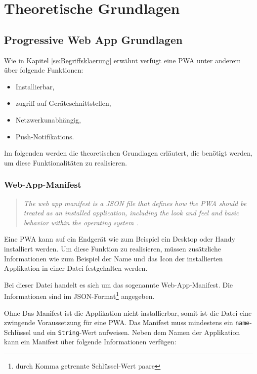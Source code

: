\chapter{Theoretische Grundlagen}

\section{Progressive Web App Grundlagen}

Wie in Kapitel \ref{se:Begriffsklaerung} erwähnt verfügt eine PWA unter anderem über folgende Funktionen: 
\begin{itemize}
    \item Installierbar,
    \item zugriff auf Geräteschnittstellen, 
    \item Netzwerkunabhängig,
    \item Push-Notifikations.
\end{itemize} 

Im folgenden werden die theoretischen Grundlagen erläutert, die benötigt werden, um diese Funktionalitäten zu realisieren. 


\subsection{Web-App-Manifest}

\begin{quote}
   \textit{The web app manifest is a JSON file that defines how the PWA should be treated as an installed application, including the look and feel and basic behavior within the operating system \cite{Developers2022}. }
\end{quote}

Eine PWA kann auf ein Endgerät wie zum Beispiel ein Desktop oder Handy installiert werden. Um diese Funktion zu realisieren, müssen zusätzliche Informationen wie zum Beispiel der Name und das Icon der installierten Applikation in einer Datei festgehalten werden. 

Bei dieser Datei handelt es sich um das sogenannte Web-App-Manifest. Die Informationen sind im \ac{JSON}-Format\footnote{durch Komma getrennte Schlüssel-Wert paare} angegeben. 

Ohne Das Manifest ist die Applikation nicht installierbar, somit ist die Datei eine zwingende Voraussetzung für eine PWA. 
Das Manifest muss mindestens ein \texttt{name}-Schlüssel und ein \texttt{String}-Wert aufweisen. 
Neben dem Namen der Applikation kann ein Manifest über folgende Informationen verfügen: 

